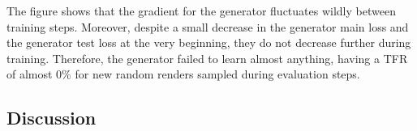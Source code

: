 The figure shows that the gradient for the generator fluctuates wildly between training steps. Moreover, despite a small decrease in the generator main loss and the generator test loss at the very beginning, they do not decrease further during training. Therefore, the generator failed to learn almost anything, having a TFR of almost 0\% for new random renders sampled during evaluation steps.
    
\subsection{Discussion}
